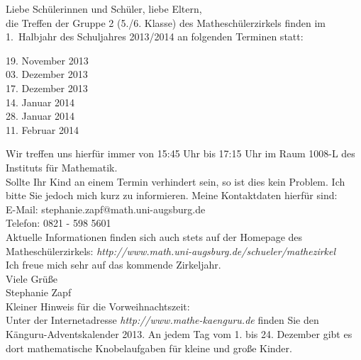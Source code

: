\documentclass{infozettel}
\begin{document}
\renewcommand{\betreff}{Informationen zum Mathesch\"ulerzirkel der Universit\"at Augsburg\\ (5./6. Klasse -- Gruppe 2)}

\makeletterhead
Liebe Sch\"ulerinnen und Sch\"uler, liebe Eltern,\\[5pt]
die Treffen der Gruppe 2 (5./6. Klasse) des Mathesch\"ulerzirkels finden im 1.\ Halbjahr des Schuljahres 2013/2014 an folgenden Terminen statt:
\begin{center}
19. November 2013\\
03. Dezember 2013\\
17. Dezember 2013\\
14. Januar 2014\\
28. Januar 2014\\
11. Februar 2014
\end{center}
Wir treffen uns hierf\"ur immer von 15:45 Uhr bis 17:15 Uhr im Raum 1008-L des Instituts f\"ur Mathematik.\\

Sollte Ihr Kind an 
einem Termin verhindert sein, so ist dies kein Problem. Ich bitte Sie jedoch mich kurz zu informieren. Meine Kontaktdaten hierf\"ur sind:\\
E-Mail: stephanie.zapf@math.uni-augsburg.de\\
Telefon: 0821 - 598 5601\\

Aktuelle Informationen finden sich auch stets auf der Homepage des Mathesch\"ulerzirkels:
\textsl{http:/\!/www.math.uni-augsburg.de/schueler/mathezirkel}\\

Ich freue mich sehr auf das kommende Zirkeljahr.\\
Viele Gr\"u\ss{}e\\[1.5cm]
Stephanie Zapf\\[1.1cm]


\footnotesize
Kleiner Hinweis f\"ur die Vorweihnachtszeit:\\
Unter der Internetadresse \textsl{http:/\!/www.mathe-kaenguru.de} finden Sie den K\"anguru-Adventskalender 2013. An jedem Tag vom 1. bis 24. Dezember 
gibt es dort mathematische Knobelaufgaben f\"ur kleine und gro\ss{}e Kinder. 
\end{document}
